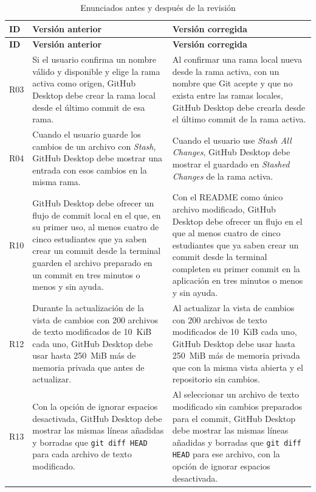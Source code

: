 \documentclass[11pt,a4paper]{article}
\begin{document}
\begingroup
\small
\setlength{\tabcolsep}{3pt}
\setlength{\LTpre}{4pt}
\setlength{\LTpost}{4pt}
\renewcommand{\arraystretch}{1.06}
\begin{longtable}{@{}l
  >{\raggedright\arraybackslash}p{7.65cm}
  >{\raggedright\arraybackslash}p{7.8cm}@{}}
\caption{Enunciados antes y después de la revisión}\label{tab:correcciones}\\
\hline
\textbf{ID} & \textbf{Versión anterior} & \textbf{Versión corregida}\\
\hline
\endfirsthead
\hline
\textbf{ID} & \textbf{Versión anterior} & \textbf{Versión corregida}\\
\hline
\endhead

R03 & Si el usuario confirma un nombre válido y disponible y elige la rama
activa como origen, GitHub Desktop debe crear la rama local desde el último
commit de esa rama. & Al confirmar una rama local nueva desde la rama
activa, con un nombre que Git acepte y que no exista entre las ramas
locales, GitHub Desktop debe crearla desde el último commit de la rama
activa.\\
\hline

R04 & Cuando el usuario guarde los cambios de un archivo con
\textit{Stash}, GitHub Desktop debe mostrar una entrada con esos cambios en
la misma rama. & Cuando el usuario use \textit{Stash All Changes}, GitHub
Desktop debe mostrar el guardado en \textit{Stashed Changes} de la rama
activa.\\
\hline

R10 & GitHub Desktop debe ofrecer un flujo de commit local en el que,
en su primer uso, al menos cuatro de cinco estudiantes que ya saben
crear un commit desde la terminal guarden el archivo preparado en un
commit en tres minutos o menos y sin ayuda. &
Con el README como único archivo modificado, GitHub Desktop debe
ofrecer un flujo en el que al menos cuatro de cinco estudiantes que ya
saben crear un commit desde la terminal completen su primer commit en
la aplicación en tres minutos o menos y sin ayuda.\\
\hline

R12 & Durante la actualización de la vista de cambios con 200 archivos de
texto modificados de 10~KiB cada uno, GitHub Desktop debe usar hasta
250~MiB más de memoria privada que antes de actualizar. & Al actualizar la
vista de cambios con 200 archivos de texto modificados de 10~KiB cada uno,
GitHub Desktop debe usar hasta 250~MiB más de memoria privada que con la
misma vista abierta y el repositorio sin cambios.\\
\hline

R13 & Con la opción de ignorar espacios desactivada, GitHub Desktop debe
mostrar las mismas líneas añadidas y borradas que \texttt{git diff HEAD}
para cada archivo de texto modificado. & Al seleccionar un archivo de texto
modificado sin cambios preparados para el commit, GitHub Desktop debe
mostrar las mismas líneas añadidas y borradas que \texttt{git diff HEAD}
para ese archivo, con la opción de ignorar espacios desactivada.\\
\hline
\end{longtable}
\endgroup
\end{document}

